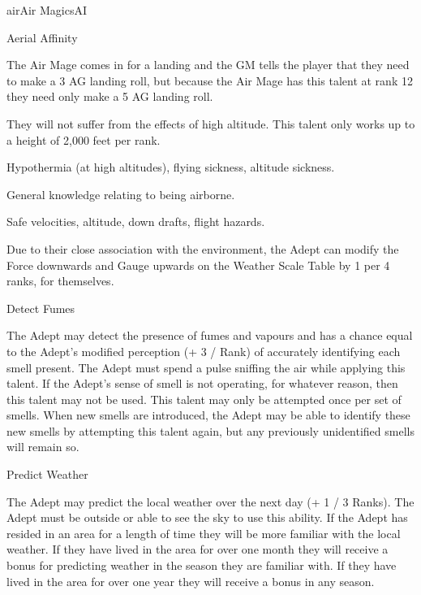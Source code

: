 \begin{college}[2.1]{air}{Air Magics}{AI}
\begin{talent}[T-1]{Aerial Affinity}
\begin{effects}
\begin{Enumerate}
\begin{example}
The Air Mage comes in for a landing and the GM tells the player that
they need to make a 3 \x AG landing roll, but because the Air Mage has
this talent at rank 12 they need only make a 5 \x AG landing roll.
\end{example}

\item
They will not suffer from the effects of high altitude. This talent
only works up to a height of 2,000 feet per rank.

\begin{example}
Hypothermia (at high altitudes), flying sickness, altitude sickness.
\end{example}

\item
General knowledge relating to being airborne.

\begin{example}
Safe velocities, altitude, down drafts, flight hazards.
\end{example}

\item
Due to their close association with the environment, the Adept can
modify the Force downwards and Gauge upwards on the Weather Scale
Table by 1 per 4 ranks, for themselves.
\end{Enumerate}
\end{effects}
\end{talent}

\begin{talent}[T-2]{Detect Fumes}
\begin{effects}
The Adept may detect the presence of fumes and vapours and
has a chance equal to the Adept's modified perception (+ 3 / Rank) of
accurately identifying each smell present. The Adept must spend a
pulse sniffing the air while applying this talent. If the Adept's
sense of smell is not operating, for whatever reason, then this talent
may not be used. This talent may only be attempted once per set of
smells. When new smells are introduced, the Adept may be able to
identify these new smells by attempting this talent again, but any
previously unidentified smells will remain so.
\end{effects}
\end{talent}

\begin{talent}[T-3]{Predict Weather}
\begin{effects}
The Adept may predict the local weather over the next day (+ 1 / 3
Ranks). The Adept must be outside or able to see the sky to use this
ability. If the Adept has resided in an area for a length of time they
will be more familiar with the local weather. If they have lived in
the area for over one month they will receive a bonus for predicting
weather in the season they are familiar with. If they have lived in
the area for over one year they will receive a bonus in any season.


\end{effects}
\end{talent}
\end{college}
